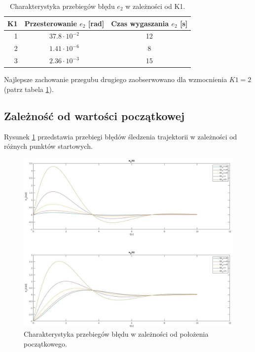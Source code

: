 \documentclass[12pt,a4paper]{article}
\begin{document}
  \begin{table}[h!]
    \centering
    \begin{tabular}{ r | c | c }
      K1 & Przesterowanie $e_2$ [rad] & Czas wygaszania $e_2$ [s]  \\ 
      \hline
      1 & $37.8 \cdot 10^{-2}$ & 12 \\
      2 & $1.41 \cdot 10^{-6}$ & 8  \\
      3 & $2.36 \cdot 10^{-3}$ & 15
    \end{tabular}
    \caption{Charakterystyka przebiegów błędu $e_2$ w zależności od K1.}
    \label{table:5}
  \end{table}

    Najlepsze zachowanie przegubu drugiego zaobserwowano dla wzmocnienia $K1=2$ (patrz tabela \ref{table:5}).


  \subsection{Zależność od wartości początkowej}

    Rysunek \ref{fig:lin3} przedstawia przebiegi błędów śledzenia trajektorii w zależności od różnych punktów startowych.

  \begin{figure}[H]
    \centering
    \includegraphics[width=1\textwidth]{figures/lin3.jpg}
    \caption{Charakterystyka przebiegów błędu w zależności od położenia początkowego.}
    \label{fig:lin3}
  \end{figure}
\end{document}
